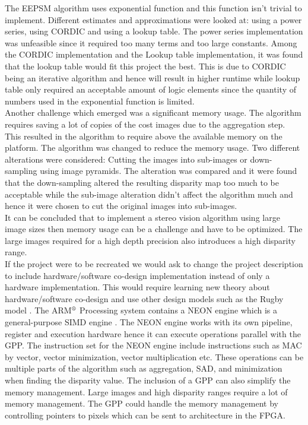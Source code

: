The EEPSM algorithm uses exponential function and this function isn't trivial to implement. Different estimates and approximations were looked at: using a power series, using CORDIC and using a lookup table. The power series implementation was unfeasible since it required too many terms and too large constants. Among the CORDIC implementation and the Lookup table implementation, it was found that the lookup table would fit this project the best. This is due to CORDIC being an iterative algorithm and hence will result in higher runtime while lookup table only required an acceptable amount of logic elements since the quantity of numbers used in the exponential function is limited.\\

Another challenge which emerged was a significant memory usage. The algorithm requires saving a lot of copies of the cost images due to the aggregation step. This resulted in the algorithm to require above the available memory on the platform. The algorithm was changed to reduce the memory usage. Two different alterations were considered: Cutting the images into sub-images or down-sampling using image pyramids. The alteration was compared and it were found that the down-sampling altered the resulting disparity map too much to be acceptable while the sub-image alteration didn't affect the algorithm much and hence it were chosen to cut the original images into sub-images.\\

It can be concluded that to implement a stereo vision algorithm using large image sizes then memory usage can be a challenge and have to be optimized. The large images required for a high depth precision also introduces a high disparity range. \\

If the project were to be recreated we would ask to change the project description to include hardware/software co-design implementation instead of only a hardware implementation. This would require learning new theory about hardware/software co-design and use other design models such as the Rugby model \cite{jantsch1999rugby}. The ARM$^\text{\textregistered}$ Processing system contains a NEON engine which is a general-purpose SIMD engine \cite{neon}. The NEON engine works with its own pipeline, register and execution hardware hence it can execute operations parallel with the GPP. The instruction set for the NEON engine include instructions such as MAC by vector, vector minimization, vector multiplication etc. These operations can be multiple parts of the algorithm such as aggregation, SAD, and minimization when finding the disparity value. The inclusion of a GPP can also simplify the memory management. Large images and high disparity ranges require a lot of memory management. The GPP could handle the memory management by controlling pointers to pixels which can be sent to architecture in the FPGA.

